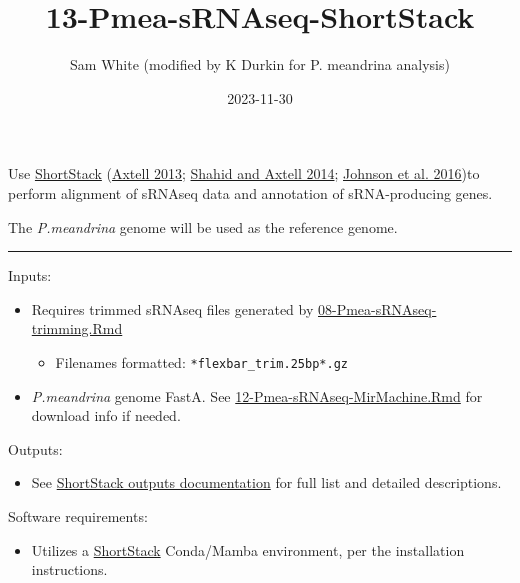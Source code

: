 \documentclass[
]{article}
\title{13-Pmea-sRNAseq-ShortStack}
\author{Sam White (modified by K Durkin for P. meandrina analysis)}
\date{2023-11-30}
\providecommand{\tightlist}{%
  \setlength{\itemsep}{0pt}\setlength{\parskip}{0pt}}
\begin{document}
\maketitle

{
\setcounter{tocdepth}{2}
\tableofcontents
}
Use \href{https://github.com/MikeAxtell/ShortStack}{ShortStack} (\protect\hyperlink{ref-axtell2013a}{Axtell 2013}; \protect\hyperlink{ref-shahid2014}{Shahid and Axtell 2014}; \protect\hyperlink{ref-johnson2016a}{Johnson et al. 2016})to perform alignment of sRNAseq data and annotation of sRNA-producing genes.

The \emph{P.meandrina} genome will be used as the reference genome.

\begin{center}\rule{0.5\linewidth}{0.5pt}\end{center}

Inputs:

\begin{itemize}
\item
  Requires trimmed sRNAseq files generated by \href{https://github.com/urol-e5/deep-dive/blob/main/F-Pmea/code/08-Pmea-sRNAseq-trimming.Rmd}{08-Pmea-sRNAseq-trimming.Rmd}

  \begin{itemize}
  \tightlist
  \item
    Filenames formatted: \texttt{*flexbar\_trim.25bp*.gz}
  \end{itemize}
\item
  \emph{P.meandrina} genome FastA. See \href{https://github.com/urol-e5/deep-dive/blob/main/F-Pmea/code/12-Pmea-sRNAseq-MirMachine.Rmd}{12-Pmea-sRNAseq-MirMachine.Rmd} for download info if needed.
\end{itemize}

Outputs:

\begin{itemize}
\tightlist
\item
  See \href{https://github.com/MikeAxtell/ShortStack\#outputs}{ShortStack outputs documentation} for full list and detailed descriptions.
\end{itemize}

Software requirements:

\begin{itemize}
\tightlist
\item
  Utilizes a \href{https://github.com/MikeAxtell/ShortStack\#installation}{ShortStack} Conda/Mamba environment, per the installation instructions.
\end{itemize}
\end{document}
